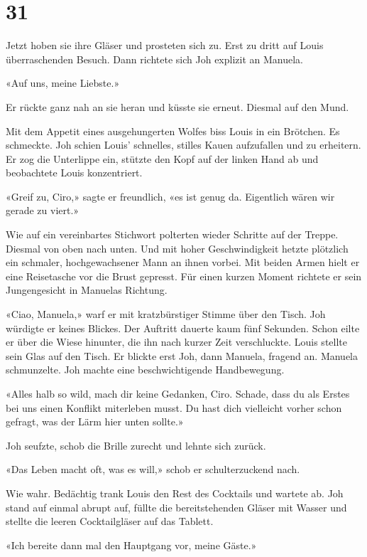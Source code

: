 \chapter{31}



Jetzt hoben sie ihre Gläser und prosteten sich zu. Erst zu dritt auf
Louis überraschenden Besuch. Dann richtete sich Joh explizit an Manuela.

«Auf uns, meine Liebste.»

Er rückte ganz nah an sie heran und küsste sie erneut. Diesmal auf den Mund.

Mit dem Appetit eines ausgehungerten Wolfes biss Louis in ein Brötchen.
Es schmeckte. Joh schien Louis’ schnelles, stilles Kauen aufzufallen und
zu erheitern. Er zog die Unterlippe ein, stützte den Kopf auf der linken
Hand ab und beobachtete Louis konzentriert.

«Greif zu, Ciro,» sagte er freundlich, «es ist genug da. Eigentlich
wären wir gerade zu viert.»

Wie auf ein vereinbartes Stichwort polterten wieder Schritte auf der
Treppe. Diesmal von oben nach unten. Und mit hoher Geschwindigkeit
hetzte plötzlich ein schmaler, hochgewachsener Mann an ihnen vorbei. Mit
beiden Armen hielt er eine Reisetasche vor die Brust gepresst. Für einen
kurzen Moment richtete er sein Jungengesicht in Manuelas Richtung.

«Ciao, Manuela,» warf er mit kratzbürstiger Stimme über den Tisch. Joh
würdigte er keines Blickes. Der Auftritt dauerte kaum fünf Sekunden.
Schon eilte er über die Wiese hinunter, die ihn nach kurzer Zeit
verschluckte.
Louis stellte sein Glas auf den Tisch. Er blickte erst Joh, dann
Manuela, fragend an. Manuela schmunzelte. Joh machte eine
beschwichtigende Handbewegung.

«Alles halb so wild, mach dir keine Gedanken, Ciro. Schade, dass du als
Erstes bei uns einen Konflikt miterleben musst. Du hast dich vielleicht
vorher schon gefragt, was der Lärm hier unten sollte.»

Joh seufzte, schob die Brille zurecht und lehnte sich zurück.

«Das Leben macht oft, was es will,» schob er schulterzuckend nach.

Wie wahr. Bedächtig trank Louis den Rest des Cocktails und wartete ab.
Joh stand auf einmal abrupt auf, füllte die bereitstehenden Gläser mit
Wasser und stellte die leeren Cocktailgläser auf das Tablett.

«Ich bereite dann mal den Hauptgang vor, meine Gäste.»

